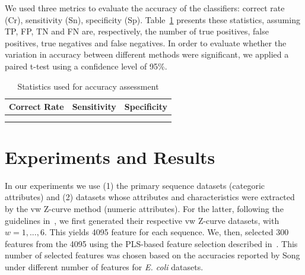 \documentclass[runningheads,a4paper]{llncs}
\begin{document}
We used three metrics to evaluate the accuracy of the classifiers: correct rate (Cr), sensitivity (Sn), specificity (Sp). Table~\ref{table:acc}  presents these statistics, assuming TP, FP, TN and FN are, respectively, the number of true positives, false positives, true negatives and false negatives.  In order to evaluate whether the variation in accuracy between different methods were significant, we applied a paired t-test using  a confidence level of 95\%.

\begin{table}

\caption{Statistics used for accuracy assessment \label{table:acc}}
\begin{center}
    \renewcommand{\arraystretch}{1.2}
    \begin{tabular}{>{\centering\arraybackslash} m{4.0cm} 
                    >{\centering\arraybackslash} m{2.5cm} 
                    >{\centering\arraybackslash} m{2.5cm}}
        \hline
            Correct Rate & Sensitivity & Specificity \\
        \hline
            \multirow{2}{*}{$\dfrac {TP+TN}{TP+FP+TN+FN}$}       &
            \multirow{2}{*}{$\dfrac {TP}{TP+FN}$}                &
            \multirow{2}{*}{$\dfrac {TN}{TN+FP}$}                \\
            & & \\
        \hline
    \end{tabular}
\end{center}
\vspace{-1.0cm}
\end{table}

\section{Experiments and Results}

In our experiments we use (1) the primary sequence datasets (categoric attributes) and (2)  datasets whose attributes  and characteristics were extracted by the vw Z-curve method (numeric attributes).  For the latter,  following the guidelines in~\cite{song2011}, we  first generated their respective  vw Z-curve datasets,  with $ w = 1, ..., 6 $.  This yields 4095 feature for each sequence. We, then,  selected 300 features from the 4095 using the PLS-based feature selection described in~\cite{song2011}. This number of selected features was chosen based on the accuracies reported by Song under different number of features for {\it E. coli } datasets. 
\end{document}
